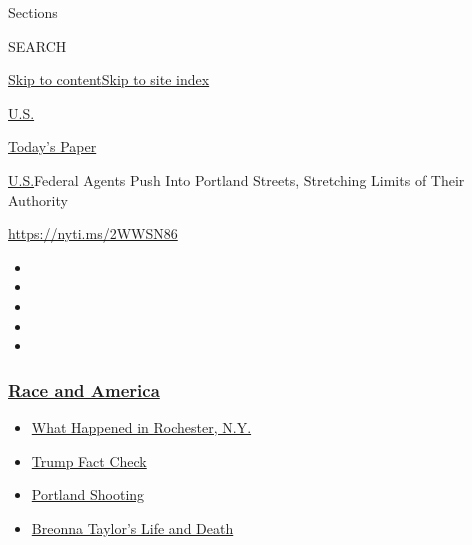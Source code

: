 Sections

SEARCH

\protect\hyperlink{site-content}{Skip to
content}\protect\hyperlink{site-index}{Skip to site index}

\href{https://www.nytimes3xbfgragh.onion/section/us}{U.S.}

\href{https://myaccount.nytimes3xbfgragh.onion/auth/login?response_type=cookie\&client_id=vi}{}

\href{https://www.nytimes3xbfgragh.onion/section/todayspaper}{Today's
Paper}

\href{/section/us}{U.S.}\textbar{}Federal Agents Push Into Portland
Streets, Stretching Limits of Their Authority

\url{https://nyti.ms/2WWSN86}

\begin{itemize}
\item
\item
\item
\item
\item
\end{itemize}

\hypertarget{race-and-america}{%
\subsubsection{\texorpdfstring{\href{https://www.nytimes3xbfgragh.onion/news-event/george-floyd-protests-minneapolis-new-york-los-angeles?name=styln-george-floyd\&region=TOP_BANNER\&block=storyline_menu_recirc\&action=click\&pgtype=Article\&impression_id=80ca6500-f298-11ea-87c3-11143d5ed90a\&variant=undefined}{Race
and America}}{Race and America}}\label{race-and-america}}

\begin{itemize}
\tightlist
\item
  \href{https://www.nytimes3xbfgragh.onion/2020/09/04/nyregion/rochester-police-daniel-prude.html?name=styln-george-floyd\&region=TOP_BANNER\&block=storyline_menu_recirc\&action=click\&pgtype=Article\&impression_id=80ca8c10-f298-11ea-87c3-11143d5ed90a\&variant=undefined}{What
  Happened in Rochester, N.Y.}
\item
  \href{https://www.nytimes3xbfgragh.onion/2020/09/01/us/politics/trump-fact-check-protests.html?name=styln-george-floyd\&region=TOP_BANNER\&block=storyline_menu_recirc\&action=click\&pgtype=Article\&impression_id=80ca8c11-f298-11ea-87c3-11143d5ed90a\&variant=undefined}{Trump
  Fact Check}
\item
  \href{https://www.nytimes3xbfgragh.onion/2020/08/30/us/portland-shooting-explained.html?name=styln-george-floyd\&region=TOP_BANNER\&block=storyline_menu_recirc\&action=click\&pgtype=Article\&impression_id=80ca8c12-f298-11ea-87c3-11143d5ed90a\&variant=undefined}{Portland
  Shooting}
\item
  \href{https://www.nytimes3xbfgragh.onion/2020/08/30/us/breonna-taylor-police-killing.html?name=styln-george-floyd\&region=TOP_BANNER\&block=storyline_menu_recirc\&action=click\&pgtype=Article\&impression_id=80ca8c13-f298-11ea-87c3-11143d5ed90a\&variant=undefined}{Breonna
  Taylor's Life and Death}
\end{itemize}

